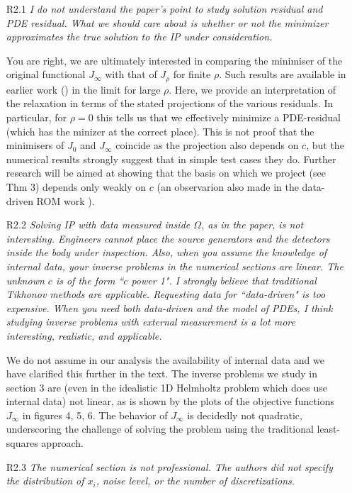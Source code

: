 \documentclass[11pt]{article}
\newcommand{\mycomment}[1]{\textit{\color{bluey}#1}}
\begin{document}
\begin{itemize}
    \item[R2.1] \mycomment{I do not understand the paper's point to study solution residual and PDE residual. What we should care about is whether or not the minimizer approximates the true solution to the IP under consideration.}

You are right, we are ultimately interested in comparing the minimiser of the original functional $J_\infty$ with that of $J_\rho$ for finite $\rho$. Such results are available in earlier work (\cite[Thm 4.3]{van2015penalty}) in the limit for large $\rho$. Here, we provide an interpretation of the relaxation in terms of the stated projections of the various residuals. In particular, for $\rho=0$ this tells us that we effectively minimize a PDE-residual (which has the minizer at the correct place). This is not proof that the minimisers of $J_0$ and $J_\infty$ coincide as the projection also depends on $c$, but the numerical results strongly suggest that in simple test cases they do. Further research will be aimed at showing that the basis on which we project (see Thm 3) depends only weakly on $c$ (an observarion also made in the data-driven ROM work \cite{Borcea2018,Borcea2020,borcea2022waveform}).


    \item[R2.2] \mycomment{Solving IP with data measured inside $\Omega$, as in the paper, is not interesting. Engineers cannot place the source generators and the detectors inside the body under inspection. Also, when you assume the knowledge of internal data, your inverse problems in the numerical sections are linear. The unknown $c$ is of the form ``$c$ power 1". I strongly believe that traditional Tikhonov methods are applicable. Requesting data for ``data-driven" is too expensive. When you need both data-driven and the model of PDEs, I think studying inverse problems with external measurement is a lot more interesting, realistic, and applicable.}

We do not assume in our analysis the availability of internal data and we have clarified this further in the text. The inverse problems we study in section 3 are (even in the idealistic 1D Helmholtz problem which does use internal data) not linear, as is shown by the plots of the objective functions $J_\infty$ in figures 4, 5, 6. The behavior of $J_\infty$ is decidedly not quadratic, underscoring the challenge of solving the problem using the traditional least-squares approach.


    \item[R2.3] \mycomment{The numerical section is not professional. The authors did not specify the distribution of $x_i$, noise level, or the number of discretizations.}


\end{itemize}
\end{document}
